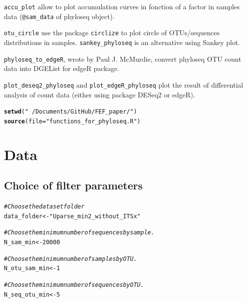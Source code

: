 \documentclass[12pt]{article}\usepackage[]{graphicx}\usepackage[]{color}
\makeatletter
\newcommand{\hlnum}[1]{\textcolor[rgb]{0.686,0.059,0.569}{#1}}%
\newcommand{\hlstr}[1]{\textcolor[rgb]{0.192,0.494,0.8}{#1}}%
\newcommand{\hlcom}[1]{\textcolor[rgb]{0.678,0.584,0.686}{\textit{#1}}}%
\newcommand{\hlstd}[1]{\textcolor[rgb]{0.345,0.345,0.345}{#1}}%
\newcommand{\hlkwb}[1]{\textcolor[rgb]{0.69,0.353,0.396}{#1}}%
\newcommand{\hlkwc}[1]{\textcolor[rgb]{0.333,0.667,0.333}{#1}}%
\newcommand{\hlkwd}[1]{\textcolor[rgb]{0.737,0.353,0.396}{\textbf{#1}}}%
\newenvironment{kframe}{%
 \def\at@end@of@kframe{}%
 \ifinner\ifhmode%
  \def\at@end@of@kframe{\end{minipage}}%
  \begin{minipage}{\columnwidth}%
 \fi\fi%
 \def\FrameCommand##1{\hskip\@totalleftmargin \hskip-\fboxsep
 \colorbox{shadecolor}{##1}\hskip-\fboxsep
     \hskip-\linewidth \hskip-\@totalleftmargin \hskip\columnwidth}%
 \MakeFramed {\advance\hsize-\width
   \@totalleftmargin\z@ \linewidth\hsize
   \@setminipage}}%
 {\par\unskip\endMakeFramed%
 \at@end@of@kframe}
\newenvironment{knitrout}{}{} %
\numberwithin{figure}{section}
\makeatother
\begin{document}
\texttt{accu\_plot} allow to plot accumulation curves in fonction of a factor in samples data (\texttt{@sam\_data} of phyloseq object).

\texttt{otu\_circle} use the package \texttt{circlize} to plot circle of OTUs/sequences distributions in samples. \texttt{sankey\_phyloseq} is an alternative using Sankey plot.

\texttt{phyloseq\_to\_edgeR}, wrote by Paul J. McMurdie, convert phyloseq OTU count data into DGEList for edgeR package.

\texttt{plot\_deseq2\_phyloseq} and \texttt{plot\_edgeR\_phyloseq} plot the result of differential analysis of count data (either using package DESeq2 or edgeR).

\begin{knitrout}\small
{}\color{fgcolor}\begin{kframe}
\begin{alltt}
\hlkwd{setwd}\hlstd{(}\hlstr{"~/Documents/GitHub/FEF_paper/"}\hlstd{)}
\hlkwd{source}\hlstd{(}\hlkwc{file} \hlstd{=} \hlstr{"functions_for_phyloseq.R"}\hlstd{)}
\end{alltt}
\end{kframe}
\end{knitrout}


\section{Data}
  
  \subsection{Choice of filter parameters}
  \label{section:filter}
\begin{knitrout}\small
{}\color{fgcolor}\begin{kframe}
\begin{alltt}
\hlcom{#Choose the dataset folder}
\hlstd{data_folder} \hlkwb{<-} \hlstr{"Uparse_min2_without_ITSx"}

\hlcom{#Choose the minimum number of sequences by sample.}
\hlstd{N_sam_min} \hlkwb{<-} \hlnum{20000}

\hlcom{#Choose the minimum number of samples by OTU.}
\hlstd{N_otu_sam_min} \hlkwb{<-} \hlnum{1}

\hlcom{#Choose the minimum number of sequences by OTU.}
\hlstd{N_seq_otu_min} \hlkwb{<-} \hlnum{5}
\end{alltt}
\end{kframe}
\end{knitrout}
\end{document}
